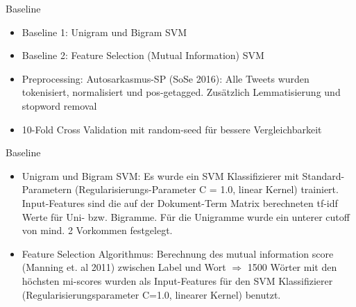 \documentclass{beamer}
\begin{document}

\begin{frame}{Baseline}
\begin{itemize}
\item Baseline 1: Unigram und Bigram SVM
\item Baseline 2: Feature Selection (Mutual Information) SVM 
\item Preprocessing: Autosarkasmus-SP (SoSe 2016): Alle Tweets wurden tokenisiert, normalisiert und pos-getagged. Zusätzlich Lemmatisierung und stopword removal
\item 10-Fold Cross Validation mit random-seed für bessere Vergleichbarkeit
\end{itemize}
\end{frame}

\begin{frame}{Baseline}
\begin{itemize}
\item Unigram und Bigram SVM: Es wurde ein SVM Klassifizierer mit Standard-Parametern (Regularisierungs-Parameter C = 1.0, linear Kernel) trainiert. Input-Features sind die auf der Dokument-Term Matrix berechneten tf-idf Werte für Uni- bzw. Bigramme. Für die Unigramme wurde ein unterer cutoff von mind. 2 Vorkommen festgelegt.   
\item Feature Selection Algorithmus: Berechnung des mutual information score (Manning et. al 2011) zwischen Label und Wort $\Rightarrow$ 1500 Wörter mit den höchsten mi-scores wurden als Input-Features für den SVM Klassifizierer (Regularisierungsparameter C=1.0, linearer Kernel) benutzt. 
\end{itemize}
\end{frame}
\end{document}
